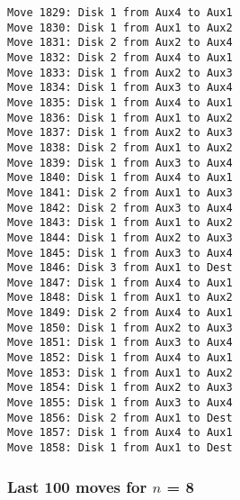 \documentclass[11pt]{article}
\begin{document}
\begin{multicols}{2}
\begin{Verbatim}[fontsize=\small]
Move 1829: Disk 1 from Aux4 to Aux1
Move 1830: Disk 1 from Aux1 to Aux2
Move 1831: Disk 2 from Aux2 to Aux4
Move 1832: Disk 2 from Aux4 to Aux1
Move 1833: Disk 1 from Aux2 to Aux3
Move 1834: Disk 1 from Aux3 to Aux4
Move 1835: Disk 1 from Aux4 to Aux1
Move 1836: Disk 1 from Aux1 to Aux2
Move 1837: Disk 1 from Aux2 to Aux3
Move 1838: Disk 2 from Aux1 to Aux2
Move 1839: Disk 1 from Aux3 to Aux4
Move 1840: Disk 1 from Aux4 to Aux1
Move 1841: Disk 2 from Aux1 to Aux3
Move 1842: Disk 2 from Aux3 to Aux4
Move 1843: Disk 1 from Aux1 to Aux2
Move 1844: Disk 1 from Aux2 to Aux3
Move 1845: Disk 1 from Aux3 to Aux4
Move 1846: Disk 3 from Aux1 to Dest
Move 1847: Disk 1 from Aux4 to Aux1
Move 1848: Disk 1 from Aux1 to Aux2
Move 1849: Disk 2 from Aux4 to Aux1
Move 1850: Disk 1 from Aux2 to Aux3
Move 1851: Disk 1 from Aux3 to Aux4
Move 1852: Disk 1 from Aux4 to Aux1
Move 1853: Disk 1 from Aux1 to Aux2
Move 1854: Disk 1 from Aux2 to Aux3
Move 1855: Disk 1 from Aux3 to Aux4
Move 1856: Disk 2 from Aux1 to Dest
Move 1857: Disk 1 from Aux4 to Aux1
Move 1858: Disk 1 from Aux1 to Dest
\end{Verbatim}

\subsubsection*{Last 100 moves for $n$ = 8}


\end{multicols}
\end{document}
